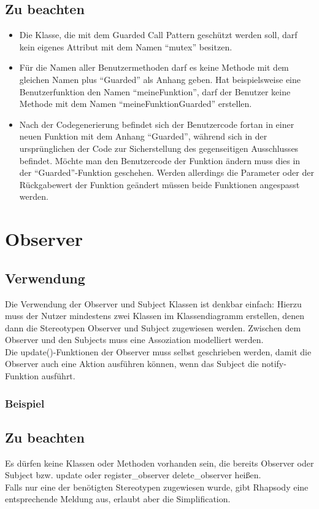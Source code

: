 \subsection{Zu beachten}
\begin{itemize}
\item Die Klasse, die mit dem Guarded Call Pattern geschützt werden soll, darf kein eigenes Attribut mit dem Namen \enquote{mutex} besitzen.
\item Für die Namen aller Benutzermethoden darf es keine Methode mit dem gleichen Namen plus \enquote{Guarded} als Anhang geben. Hat beispielsweise eine Benutzerfunktion den Namen \enquote{meineFunktion}, darf der Benutzer keine Methode mit dem Namen \enquote{meineFunktionGuarded} erstellen.
\item Nach der Codegenerierung befindet sich der Benutzercode fortan in einer neuen Funktion mit dem Anhang \enquote{Guarded}, während sich in der ursprünglichen der Code zur Sicherstellung des gegenseitigen Ausschlusses befindet. Möchte man den Benutzercode der Funktion ändern muss dies in der \enquote{Guarded}-Funktion geschehen. Werden allerdings die Parameter oder der Rückgabewert der Funktion geändert müssen beide Funktionen angespasst werden.
\end{itemize}


\section{Observer}

\subsection{Verwendung}

Die Verwendung der Observer und Subject Klassen ist denkbar einfach: Hierzu muss
der Nutzer mindestens zwei Klassen im Klassendiagramm erstellen, denen dann die
Stereotypen Observer und Subject zugewiesen werden. Zwischen dem Observer und
den Subjects muss eine Assoziation modelliert werden. \\
Die update()-Funktionen der Observer muss selbst geschrieben werden, damit die
Observer auch eine Aktion ausführen können, wenn das Subject die notify-Funktion ausführt.

\subsubsection{Beispiel}

\subsection{Zu beachten}

Es dürfen keine Klassen oder Methoden vorhanden sein, die bereits Observer oder
Subject bzw. update oder register_observer delete_observer heißen.\\

Falls nur eine der benötigten Stereotypen zugewiesen wurde, gibt Rhapsody eine
entsprechende Meldung aus, erlaubt aber die Simplification.\\

